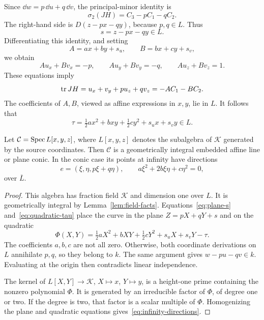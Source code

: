 Since $\dd w=p\,\dd u+q\,\dd v$, the principal-minor identity is
\begin{equation}\label{eq:plane-sigma}
 \sigma_2(JH)=C_3-pC_1-qC_2.
\end{equation}
The right-hand side is $D(z-px-qy)$, because $p,q\in L$. Thus
\begin{equation}\label{eq:plane-s}
 s=z-px-qy\in L.
\end{equation}
Differentiating this identity, and setting
\[
 A=ax+by+s_u,\qquad B=bx+cy+s_v,
\]
we obtain
\begin{equation}\label{eq:plane-differentials}
 Au_x+Bv_x=-p,\qquad Au_y+Bv_y=-q,\qquad Au_z+Bv_z=1.
\end{equation}
These equations imply
\[
 \operatorname{tr} JH=u_x+v_y+pu_z+qv_z=-AC_1-BC_2.
\]
The coefficients of $A,B$, viewed as affine expressions in $x,y$, lie in $L$. It follows that
\begin{equation}\label{eq:quadratic-tau}
 \tau=\tfrac12ax^2+bxy+\tfrac12cy^2+s_ux+s_vy\in L.
\end{equation}

\begin{proposition}\label{prop:line-conic}
Let $\mathcal C=\operatorname{Spec} L[x,y,z]$, where $L[x,y,z]$ denotes the subalgebra of $\mathcal K$ generated by the source coordinates. Then $\mathcal C$ is a geometrically integral embedded affine line or plane conic. In the conic case its points at infinity have directions
\begin{equation}\label{eq:infinity-directions}
 e=(\xi,\eta,p\xi+q\eta),\qquad a\xi^2+2b\xi\eta+c\eta^2=0,
\end{equation}
over $\overline L$.
\end{proposition}

\begin{proof}
This algebra has fraction field $\mathcal K$ and dimension one over $L$. It is geometrically integral by Lemma~\ref{lem:field-facts}. Equations~\eqref{eq:plane-s} and~\eqref{eq:quadratic-tau} place the curve in the plane $Z=pX+qY+s$ and on the quadratic
\[
 \Phi(X,Y)=\tfrac12aX^2+bXY+\tfrac12cY^2+s_uX+s_vY-\tau.
\]
The coefficients $a,b,c$ are not all zero. Otherwise, both coordinate derivations on $L$ annihilate $p,q$, so they belong to $k$. The same argument gives $w-pu-qv\in k$. Evaluating at the origin then contradicts linear independence.

The kernel of $L[X,Y]\to \mathcal K$, $X\mapsto x$, $Y\mapsto y$, is a height-one prime containing the nonzero polynomial $\Phi$. It is generated by an irreducible factor of $\Phi$, of degree one or two. If the degree is two, that factor is a scalar multiple of $\Phi$. Homogenizing the plane and quadratic equations gives~\eqref{eq:infinity-directions}.
\end{proof}

